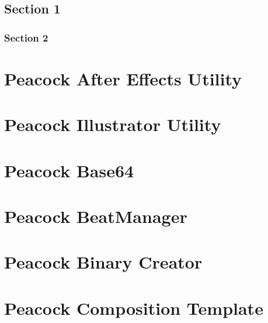 \documentclass[a4paper,11pt,openany,oneside,english]{sphinxmanual}
\begin{document}
\subsection{Section 1}
\label{\detokenize{getting_started/getting_started:section-1}}

\subsubsection{Section 2}
\label{\detokenize{getting_started/getting_started:section-2}}

\section{Peacock After Effects Utility}
\label{\detokenize{modules/ae_utils/readme:peacock-after-effects-utility}}\label{\detokenize{modules/ae_utils/readme::doc}}

\section{Peacock Illustrator Utility}
\label{\detokenize{modules/ai_utils/readme:peacock-illustrator-utility}}\label{\detokenize{modules/ai_utils/readme::doc}}

\section{Peacock Base64}
\label{\detokenize{modules/base64/readme:peacock-base64}}\label{\detokenize{modules/base64/readme::doc}}

\section{Peacock BeatManager}
\label{\detokenize{modules/beatmanager/readme:peacock-beatmanager}}\label{\detokenize{modules/beatmanager/readme::doc}}

\section{Peacock Binary Creator}
\label{\detokenize{modules/binarycreator/readme:peacock-binary-creator}}\label{\detokenize{modules/binarycreator/readme::doc}}

\section{Peacock Composition Template}
\label{\detokenize{modules/comp_template/readme:peacock-composition-template}}\label{\detokenize{modules/comp_template/readme::doc}}
\end{document}
